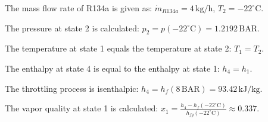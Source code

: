 The mass flow rate of R134a is given as:  
\( \dot{m}_{R134a} = 4 \, \text{kg/h} \), \( T_2 = -22^\circ \text{C} \).  

The pressure at state 2 is calculated:  
\( p_2 = p(-22^\circ \text{C}) = 1.2192 \, \text{BAR} \).  

The temperature at state 1 equals the temperature at state 2:  
\( T_1 = T_2 \).  

The enthalpy at state 4 is equal to the enthalpy at state 1:  
\( h_4 = h_1 \).  

The throttling process is isenthalpic:  
\( h_4 = h_f(8 \, \text{BAR}) = 93.42 \, \text{kJ/kg} \).  

The vapor quality at state 1 is calculated:  
\( x_1 = \frac{h_4 - h_f(-22^\circ \text{C})}{h_{fg}(-22^\circ \text{C})} \approx 0.337 \).